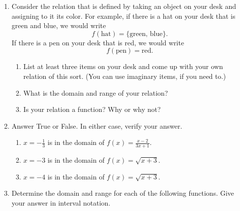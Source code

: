 \begin{enumerate}

\item Consider the relation that is defined by taking an object on your desk and assigning to it its color.  For example, if there is a hat on your desk that is green and blue, we would write
$$f(\text{hat}) = \{\text{green, blue}\}.$$
If there is a pen on your desk that is red, we would write
$$f(\text{pen}) = \text{red}.$$

\begin{enumerate}
\item List at least three items on your desk and come up with your own relation of this sort. (You can use imaginary items, if you need to.)
\vfil
\item What is the domain and range of your relation?
\vspace{.75in}
\item Is your relation a function?  Why or why not?
\end{enumerate}


\vspace{.5in}

\item Answer True or False.  In either case, verify your answer.

\begin{enumerate}
\item $x=-\frac{1}{3}$ is in the domain of $\displaystyle f(x)=\frac{x-2}{3x+1}$.
\vspace{.5in}
\item $x=-3$ is in the domain of $\displaystyle f(x)=\sqrt{x+3}$.
\vspace{.5in}
\item $x=-4$ is in the domain of $\displaystyle f(x)=\sqrt{x+3}$.
\end{enumerate}

\newpage


\item Determine the domain and range for each of the following functions.  Give your answer in interval notation.
\vspace{-.5in}
\begin{enumerate}


\end{enumerate}
\end{enumerate}
